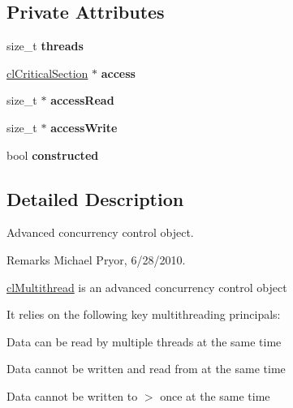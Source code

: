 \subsection*{Private Attributes}
\begin{DoxyCompactItemize}
\item 
\hypertarget{classcl_multithread_aef449ad37520c06f51bd359a1ac8d693}{
size\_\-t {\bfseries threads}}
\label{classcl_multithread_aef449ad37520c06f51bd359a1ac8d693}

\item 
\hypertarget{classcl_multithread_a559f7f4fbe0a9fe0aa7b5cc8388bdb15}{
\hyperlink{classcl_critical_section}{clCriticalSection} $\ast$ {\bfseries access}}
\label{classcl_multithread_a559f7f4fbe0a9fe0aa7b5cc8388bdb15}

\item 
\hypertarget{classcl_multithread_a54fe801c5a6c2283f2beacd686697603}{
size\_\-t $\ast$ {\bfseries accessRead}}
\label{classcl_multithread_a54fe801c5a6c2283f2beacd686697603}

\item 
\hypertarget{classcl_multithread_a041ef3eeb08808daf52022ef35fd782d}{
size\_\-t $\ast$ {\bfseries accessWrite}}
\label{classcl_multithread_a041ef3eeb08808daf52022ef35fd782d}

\item 
\hypertarget{classcl_multithread_adcd166af132ca0191af30813431867ea}{
bool {\bfseries constructed}}
\label{classcl_multithread_adcd166af132ca0191af30813431867ea}

\end{DoxyCompactItemize}


\subsection{Detailed Description}
Advanced concurrency control object. \begin{DoxyRemark}{Remarks}
Michael Pryor, 6/28/2010.
\end{DoxyRemark}
\hyperlink{classcl_multithread}{clMultithread} is an advanced concurrency control object \par
 It relies on the following key multithreading principals:
\begin{DoxyItemize}
\item Data can be read by multiple threads at the same time
\item Data cannot be written and read from at the same time
\item Data cannot be written to $>$ once at the same time
\end{DoxyItemize}

